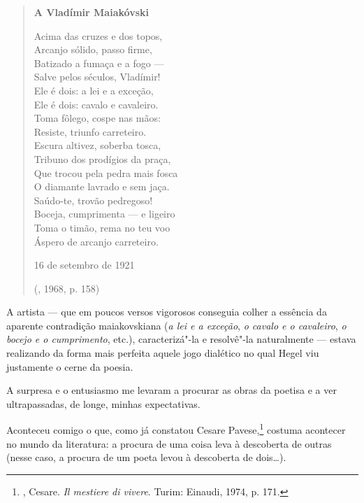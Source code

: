 \begin{verse}
\textbf{A Vladímir Maiakóvski}

Acima das cruzes e dos topos, \\
Arcanjo sólido, passo firme, \\
Batizado a fumaça e a fogo --- \\
Salve pelos séculos, Vladímir! \\[8pt]
Ele é dois: a lei e a exceção, \\
Ele é dois: cavalo e cavaleiro. \\
Toma fôlego, cospe nas mãos: \\
Resiste, triunfo carreteiro. \\[8pt]
Escura altivez, soberba tosca, \\
Tribuno dos prodígios da praça, \\
Que trocou pela pedra mais fosca \\
O diamante lavrado e sem jaça. \\[8pt]
Saúdo-te, trovão pedregoso! \\
Boceja, cumprimenta --- e ligeiro \\
Toma o timão, rema no teu voo \\
Áspero de arcanjo carreteiro. 

16 de setembro de 1921

(, 1968, p. 158)
\end{verse}

A artista --- que em poucos versos vigorosos conseguia colher a
essência da aparente contradição maiakovskiana (\emph{a lei e a
exceção}, \emph{o cavalo e o cavaleiro}, \emph{o bocejo e o
cumprimento}, etc.), caracterizá"-la e resolvê"-la naturalmente
--- estava realizando da forma mais perfeita aquele jogo dialético
no qual Hegel viu justamente o cerne da poesia.

A surpresa e o entusiasmo me levaram a procurar as obras da
poetisa e a ver ultrapassadas, de longe, minhas expectativas.

Aconteceu comigo o que, como já constatou Cesare
Pavese,\footnote{, Cesare. \emph{Il mestiere di
vivere}. Turim: Einaudi, 1974, p. 171.} costuma acontecer no
mundo da literatura: a procura de uma coisa leva à descoberta
de outras (nesse caso, a procura de um poeta levou à
descoberta de dois\ldots{}).

